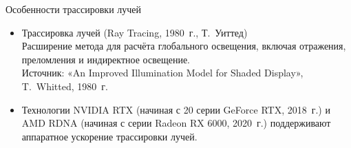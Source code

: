 \documentclass{beamer}
\begin{document}
	\begin{frame}{Особенности трассировки лучей}
				
		\begin{itemize}
			\item 
			Трассировка лучей (Ray Tracing, 1980~г., Т.~Уиттед)\\
			Расширение метода для расчёта глобального освещения, включая отражения, преломления и индиректное освещение.\\
			{Источник:} «An Improved Illumination Model for Shaded Display», T.~Whitted, 1980~г.

			\item
			Технологии NVIDIA RTX (начиная с 20 серии GeForce RTX, 2018~г.) и AMD RDNA (начиная с серии Radeon RX 6000, 2020~г.) 
			поддерживают аппаратное ускорение трассировки лучей.

		\end{itemize}

		
	\end{frame}
\end{document}
